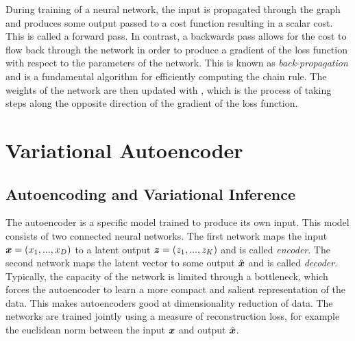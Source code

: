During training of a neural network, the input is propagated through the graph and produces some output passed to a cost function resulting in a scalar cost. This is called a forward pass. In contrast, a backwards pass allows for the cost to flow back through the network in order to produce a gradient of the loss function with respect to the parameters of the network. This is known as \emph{back-propagation} and is a fundamental algorithm for efficiently computing the chain rule. The weights of the network are then updated with , which is the process of taking steps along the opposite direction of the gradient of the loss function. %


\section{Variational Autoencoder}

\subsection{Autoencoding and Variational Inference}

The autoencoder is a specific model trained to produce its own input. This model consists of two connected neural networks. The first network maps the input $\boldsymbol{x} = (x_1, ..., x_D)$ to a latent output $\boldsymbol{z} = (z_1, ..., z_K)$ and is called \emph{encoder}. The second network maps the latent vector to some output $\hat{\boldsymbol{x}}$ and is called \emph{decoder}. Typically, the capacity of the network is limited through a bottleneck, which forces the autoencoder to learn a more compact and salient representation of the data. This makes autoencoders good at dimensionality reduction of data. The networks are trained jointly using a measure of reconstruction loss, for example the euclidean norm between the input $\boldsymbol{x}$ and output $\hat{\boldsymbol{x}}$.


